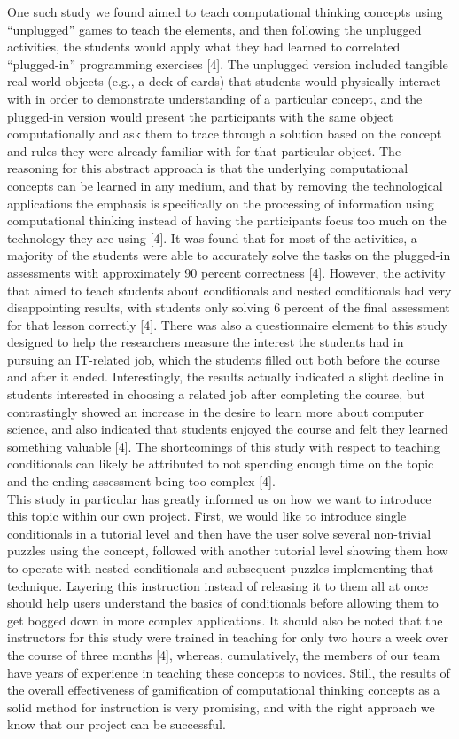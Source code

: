 One such study we found aimed to teach computational thinking concepts using “unplugged” games to teach the elements, and then following the unplugged activities, the students would apply what they had learned to correlated “plugged-in” programming exercises [4]. The unplugged version included tangible real world objects (e.g., a deck of cards) that students would physically interact with in order to demonstrate understanding of a particular concept, and the plugged-in version would present the participants with the same object computationally and ask them to trace through a solution based on the concept and rules they were already familiar with for that particular object. The reasoning for this abstract approach is that the underlying computational concepts can be learned in any medium, and that by removing the technological applications the emphasis is specifically on the processing of information using computational thinking instead of having the participants focus too much on the technology they are using [4]. It was found that for most of the activities, a majority of the students were able to accurately solve the tasks on the plugged-in assessments with approximately 90 percent correctness [4]. However, the activity that aimed to teach students about conditionals and nested conditionals had very disappointing results, with students only solving 6 percent of the final assessment for that lesson correctly [4]. There was also a questionnaire element to this study designed to help the researchers measure the interest the students had in pursuing an IT-related job, which the students filled out both before the course and after it ended. Interestingly, the results actually indicated a slight decline in students interested in choosing a related job after completing the course, but contrastingly showed an increase in the desire to learn more about computer science, and also indicated that students enjoyed the course and felt they learned something valuable [4]. The shortcomings of this study with respect to teaching conditionals can likely be attributed to not spending enough time on the topic and the ending assessment being too complex [4].\\

This study in particular has greatly informed us on how we want to introduce this topic within our own project. First, we would like to introduce single conditionals in a tutorial level and then have the user solve several non-trivial puzzles using the concept, followed with another tutorial level showing them how to operate with nested conditionals and subsequent puzzles implementing that technique. Layering this instruction instead of releasing it to them all at once should help users understand the basics of conditionals before allowing them to get bogged down in more complex applications. It should also be noted that the instructors for this study were trained in teaching for only two hours a week over the course of three months [4], whereas, cumulatively, the members of our team have years of experience in teaching these concepts to novices. Still, the results of the overall effectiveness of gamification of computational thinking concepts as a solid method for instruction is very promising, and with the right approach we know that our project can be successful.\\